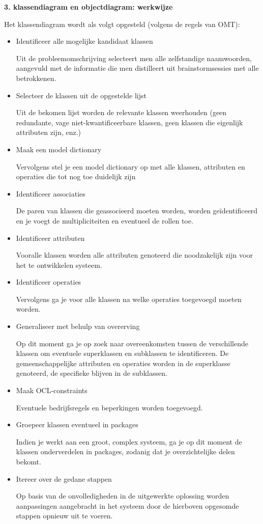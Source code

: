 \textbf{3. klassendiagram en objectdiagram: werkwijze}

Het klassendiagram wordt als volgt opgesteld (volgens de regels van OMT):

\begin{itemize}
    \item Identificeer alle mogelijke kandidaat klassen
    
    Uit de probleemomschrijving selecteert men alle zelfstandige naamwoorden, aangevuld met de informatie die men distilleert uit brainstormsessies met alle betrokkenen.
    \item Selecteer de klassen uit de opgestelde lijst
    
    Uit de bekomen lijst worden de relevante klassen weerhouden (geen redundante, vage niet-kwantificeerbare klassen, geen klassen die eigenlijk attributen zijn, enz.)
    \item Maak een model dictionary
    
    Vervolgens stel je een model dictionary op met alle klassen, attributen en operaties die tot nog toe duidelijk zijn
    \item Identificeer associaties
    
    De paren van klassen die geassocieerd moeten worden, worden geïdentificeerd en je voegt de multipliciteiten en eventueel de rollen toe.
    \item Identificeer attributen
    
    Vooralle klassen worden alle attributen genoteerd die noodzakelijk zijn voor het te ontwikkelen systeem.
    \item Identificeer operaties
    
    Vervolgens ga je voor alle klassen na welke operaties toegevoegd moeten worden.
    \item Generaliseer met behulp van overerving
    
    Op dit moment ga je op zoek naar overeenkomsten tussen de verschillende klassen om eventuele superklassen en subklassen te identificeren. De gemeenschappelijke attributen en operaties worden in de superklasse genoteerd, de specifieke blijven in de subklassen.

\item Maak OCL-constraints

Eventuele bedrijfsregels en beperkingen worden toegevoegd.

\item Groepeer klassen eventueel in packages

Indien je werkt aan een groot, complex systeem, ga je op dit moment de klassen onderverdelen in packages, zodanig dat je overzichtelijke delen bekomt.
\item Itereer over de gedane stappen

Op basis van de onvolledigheden in de uitgewerkte oplossing worden aanpassingen aangebracht in het systeem door de hierboven opgesomde stappen opnieuw uit te voeren.
\end{itemize}

